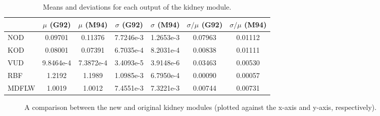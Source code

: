 \documentclass{scrartcl}
\begin{document}
\begin{table}
  \centering
  \begin{tabular}{lcccccc}
    \toprule
      & $\mu$ (G92) & $\mu$ (M94) & $\sigma$ (G92) & $\sigma$ (M94) & $\sigma/\mu$ (G92) & $\sigma/\mu$ (M94) \\
    \midrule
    NOD & 0.09701 & 0.11376 & 7.7246e-3 & 1.2653e-3 & 0.07963 & 0.01112 \\
    KOD & 0.08001 & 0.07391 & 6.7035e-4 & 8.2031e-4 & 0.00838 & 0.01111 \\
    VUD & 9.8464e-4 & 7.3872e-4 & 3.4093e-5 & 3.9148e-6 & 0.03463 & 0.00530 \\
    RBF & 1.2192 & 1.1989 & 1.0985e-3 & 6.7950e-4 & 0.00090 & 0.00057 \\
    MDFLW & 1.0019 & 1.0012 & 7.4551e-3 & 7.3221e-3 & 0.00744 & 0.00731 \\
    \bottomrule
  \end{tabular}
  \caption{Means and deviations for each output of the kidney module.}
  \label{tbl:stats}
\end{table}

\begin{figure}
  \centering


  \caption{A comparison between the new and original kidney modules (plotted
    against the x-axis and y-axis, respectively).}
  \label{fig:cmp}
\end{figure}

\clearpage


\end{document}
